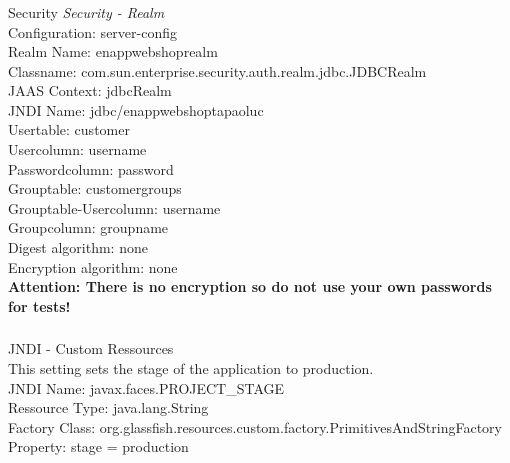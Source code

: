 \documentclass[11pt]{amsart}
\begin{document}
\subsubsection{}Security
%
\textit{Security - Realm} \\
Configuration: server-config \\
Realm Name: enappwebshoprealm \\
Classname: com.sun.enterprise.security.auth.realm.jdbc.JDBCRealm \\
JAAS Context: jdbcRealm \\
JNDI Name: jdbc/enappwebshoptapaoluc \\
Usertable: customer \\
Usercolumn: username \\
Passwordcolumn: password \\
Grouptable: customergroups \\
Grouptable-Usercolumn: username \\
Groupcolumn: groupname \\
Digest algorithm: none \\
Encryption algorithm: none \\
%
\textbf{Attention: There is no encryption so do not use your own passwords for tests!}
%
\subsubsection{}JNDI - Custom Ressources \\
This setting sets the stage of the application to production. \\
JNDI Name: javax.faces.PROJECT\_STAGE \\
Ressource Type: java.lang.String \\
Factory Class: org.glassfish.resources.custom.factory.PrimitivesAndStringFactory \\
Property: stage = production \\
%
\newpage{}
\end{document}
